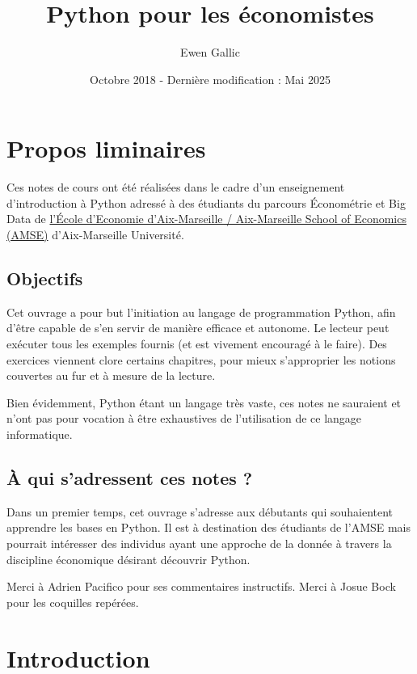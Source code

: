 \documentclass[
  12pt,
]{book}
\title{Python pour les économistes}
\author{Ewen Gallic}
\date{Octobre 2018 - Dernière modification : Mai 2025}
\numberwithin{equation}{section}
\numberwithin{countremarque}{section}
\newcounter{exercices}[section]
\begin{document}
\maketitle

{
\hypersetup{linkcolor=}
\setcounter{tocdepth}{3}
\tableofcontents
}
\listoffigures
\listoftables
\chapter*{Propos liminaires}\label{propos-liminaires}

Ces notes de cours ont été réalisées dans le cadre d'un enseignement d'introduction à Python adressé à des étudiants du parcours Économétrie et Big Data de \href{https://www.amse-aixmarseille.fr/}{l'École d'Economie d'Aix-Marseille / Aix-Marseille School of Economics (AMSE)} d'Aix-Marseille Université.

\section{Objectifs}\label{objectifs}

Cet ouvrage a pour but l'initiation au langage de programmation Python, afin d'être capable de s'en servir de manière efficace et autonome. Le lecteur peut exécuter tous les exemples fournis (et est vivement encouragé à le faire). Des exercices viennent clore certains chapitres, pour mieux s'approprier les notions couvertes au fur et à mesure de la lecture.

Bien évidemment, Python étant un langage très vaste, ces notes ne sauraient et n'ont pas pour vocation à être exhaustives de l'utilisation de ce langage informatique.

\section{À qui s'adressent ces notes ?}\label{uxe0-qui-sadressent-ces-notes}

Dans un premier temps, cet ouvrage s'adresse aux débutants qui souhaientent apprendre les bases en Python. Il est à destination des étudiants de l'AMSE mais pourrait intéresser des individus ayant une approche de la donnée à travers la discipline économique désirant découvrir Python.

Merci à Adrien Pacifico pour ses commentaires instructifs. Merci à Josue Bock pour les coquilles repérées.

\chapter{Introduction}\label{introduction}
\end{document}
